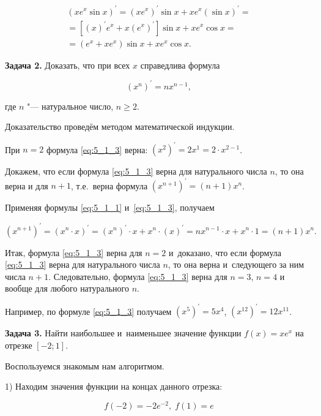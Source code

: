 \begin{multline*}
(xe^{x} \sin x)^\prime = (xe^{x})^\prime \sin x + xe^{x}(\sin x)^\prime = \\
= \left[ (x)^\prime e^{x} + x(e^{x})^\prime \right] \sin x + xe^{x} \cos x = \\
= \left( e^{x} + xe^{x} \right) \sin x + xe^{x} \cos x.
\end{multline*}

\textbf{Задача 2.}\label{ex:5_1_2} Доказать, что при всех $x$ справедлива формула

\begin{equation}\label{eq:5_1_3}
\left( x^{n} \right)^\prime = nx^{n-1},
\end{equation}

\noindent
где $n$ "--- натуральное число, $n \geqslant 2$.

Доказательство проведём методом математической индукции.

При $n = 2$ формула \eqref{eq:5_1_3} верна:
$\left( x^{2} \right)^\prime = 2x^{1} = 2 \cdot x^{2 - 1}$.

Докажем, что если формула \eqref{eq:5_1_3} верна для натурального числа $n$,
то она верна и для $n+1$, т.е.\ верна формула
$\left( x^{n+1} \right)^\prime = (n+1)x^{n}$.

Применяя формулы \eqref{eq:5_1_1} и~\eqref{eq:5_1_3}, получаем

\begin{equation*}
(x^{n+1})^\prime = (x^{n} \cdot x)^\prime =
(x^{n})^\prime \cdot x + x^{n} \cdot (x)^\prime =
nx^{n-1} \cdot x + x^{n} \cdot 1 = (n + 1) x^{n}.
\end{equation*}

Итак, формула \eqref{eq:5_1_3} верна для $n=2$ и~доказано,
что если формула \eqref{eq:5_1_3} верна для натурального числа $n$,
то она верна и~следующего за ним числа $n+1$.
Следовательно, формула \eqref{eq:5_1_3} верна для $n=3$, $n=4$ и вообще для любого
натурального $n$.

Например, по формуле \eqref{eq:5_1_3} получаем
$\left( x^{5} \right)^\prime  = 5x^{4}$,
$\left( x^{12} \right)^\prime  = 12x^{11}$.

\textbf{Задача 3.}\label{ex:5_1_3} Найти наибольшее и~наименьшее значение функции
$f(x) = xe^{x}$ на отрезке $[-2; 1]$.

Воспользуемся знакомым нам алгоритмом.

1) Находим значения функции на концах данного отрезка:

\begin{equation*}
f(-2) = -2e^{-2}, \; f(1) = e
\end{equation*}

